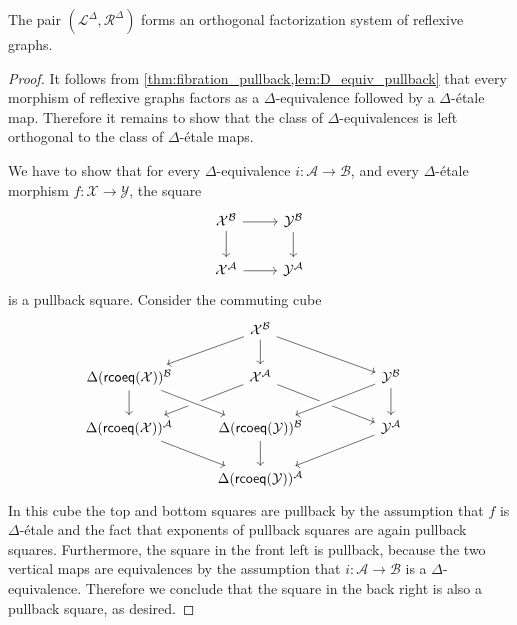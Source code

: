 \begin{thm}\label{thm:modal_rofs}
The pair $(\mathcal{L}^\Delta,\mathcal{R}^\Delta)$ forms an orthogonal factorization system of reflexive graphs.
\end{thm}

\begin{proof}
It follows from \cref{thm:fibration_pullback,lem:D_equiv_pullback} that every morphism of reflexive graphs factors as a $\Delta$-equivalence followed by a $\Delta$-\'etale map. Therefore it remains to show that the class of $\Delta$-equivalences is left orthogonal to the class of $\Delta$-\'etale maps.

We have to show that for every $\Delta$-equivalence $i:\mathcal{A}\to\mathcal{B}$, and every $\Delta$-\'etale morphism $f:\mathcal{X}\to\mathcal{Y}$, the square
\begin{equation*}
\begin{tikzcd}
\mathcal{X}^{\mathcal{B}} \arrow[r] \arrow[d] & \mathcal{Y}^{\mathcal{B}} \arrow[d] \\
\mathcal{X}^{\mathcal{A}} \arrow[r] & \mathcal{Y}^{\mathcal{A}}
\end{tikzcd}
\end{equation*}
is a pullback square. Consider the commuting cube
\begin{equation*}
\begin{tikzcd}
& \mathcal{X}^{\mathcal{B}} \arrow[dl] \arrow[d] \arrow[dr] \\
\Delta(\rcoeq(\mathcal{X}))^{\mathcal{B}} \arrow[d] & \mathcal{X}^{\mathcal{A}} \arrow[dl] \arrow[dr] & \mathcal{Y}^{\mathcal{B}} \arrow[d] \arrow[dl,crossing over] \\
\Delta(\rcoeq(\mathcal{X}))^{\mathcal{A}} \arrow[dr] & \Delta(\rcoeq(\mathcal{Y}))^{\mathcal{B}} \arrow[from=ul,crossing over] \arrow[d] & \mathcal{Y}^{\mathcal{A}} \arrow[dl] \\
& \Delta(\rcoeq(\mathcal{Y}))^{\mathcal{A}} & \phantom{\Delta(\rcoeq(\mathcal{X}))^{\mathcal{B}}}
\end{tikzcd}
\end{equation*}
In this cube the top and bottom squares are pullback by the assumption that $f$ is $\Delta$-\'etale and the fact that exponents of pullback squares are again pullback squares. Furthermore, the square in the front left is pullback, because the two vertical maps are equivalences by the assumption that $i:\mathcal{A}\to\mathcal{B}$ is a $\Delta$-equivalence. Therefore we conclude that the square in the back right is also a pullback square, as desired.
\end{proof}

